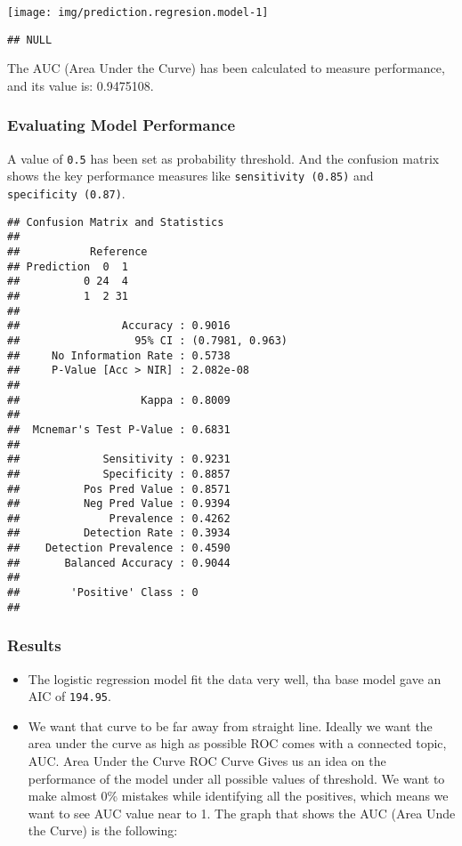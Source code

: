 \documentclass[]{article}
\providecommand{\tightlist}{%
  \setlength{\itemsep}{0pt}\setlength{\parskip}{0pt}}
\begin{document}
\begin{center}\texttt{[image: img/prediction.regresion.model-1]} \end{center}

\begin{verbatim}
## NULL
\end{verbatim}

The AUC (Area Under the Curve) has been calculated to measure
performance, and its value is: 0.9475108.

\hypertarget{evaluating-model-performance}{%
\subsubsection{Evaluating Model
Performance}\label{evaluating-model-performance}}

A value of \texttt{0.5} has been set as probability threshold. And the
confusion matrix shows the key performance measures like
\texttt{sensitivity\ (0.85)} and \texttt{specificity\ (0.87)}.

\begin{verbatim}
## Confusion Matrix and Statistics
## 
##           Reference
## Prediction  0  1
##          0 24  4
##          1  2 31
##                                          
##                Accuracy : 0.9016         
##                  95% CI : (0.7981, 0.963)
##     No Information Rate : 0.5738         
##     P-Value [Acc > NIR] : 2.082e-08      
##                                          
##                   Kappa : 0.8009         
##                                          
##  Mcnemar's Test P-Value : 0.6831         
##                                          
##             Sensitivity : 0.9231         
##             Specificity : 0.8857         
##          Pos Pred Value : 0.8571         
##          Neg Pred Value : 0.9394         
##              Prevalence : 0.4262         
##          Detection Rate : 0.3934         
##    Detection Prevalence : 0.4590         
##       Balanced Accuracy : 0.9044         
##                                          
##        'Positive' Class : 0              
## 
\end{verbatim}

\hypertarget{results}{%
\subsubsection{Results}\label{results}}

\begin{itemize}
\tightlist
\item
  The logistic regression model fit the data very well, tha base model
  gave an AIC of \texttt{194.95}.\\
\item
  We want that curve to be far away from straight line. Ideally we want
  the area under the curve as high as possible ROC comes with a
  connected topic, AUC. Area Under the Curve ROC Curve Gives us an idea
  on the performance of the model under all possible values of
  threshold. We want to make almost 0\% mistakes while identifying all
  the positives, which means we want to see AUC value near to 1. The
  graph that shows the AUC (Area Unde the Curve) is the following:
\end{itemize}
\end{document}
